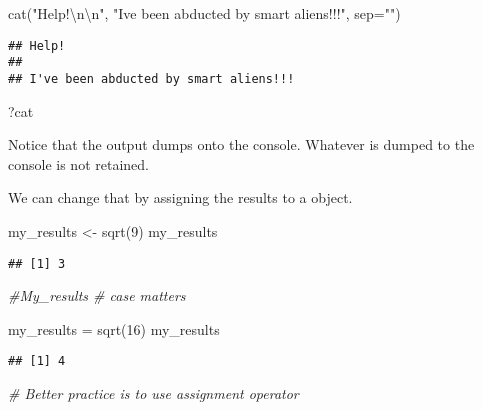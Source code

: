 \documentclass[
]{article}
\newenvironment{Shaded}{\begin{snugshade}}{\end{snugshade}}
\newcommand{\AttributeTok}[1]{\textcolor[rgb]{0.77,0.63,0.00}{#1}}
\newcommand{\CommentTok}[1]{\textcolor[rgb]{0.56,0.35,0.01}{\textit{#1}}}
\newcommand{\DecValTok}[1]{\textcolor[rgb]{0.00,0.00,0.81}{#1}}
\newcommand{\FunctionTok}[1]{\textcolor[rgb]{0.00,0.00,0.00}{#1}}
\newcommand{\NormalTok}[1]{#1}
\newcommand{\OtherTok}[1]{\textcolor[rgb]{0.56,0.35,0.01}{#1}}
\newcommand{\SpecialCharTok}[1]{\textcolor[rgb]{0.00,0.00,0.00}{#1}}
\newcommand{\StringTok}[1]{\textcolor[rgb]{0.31,0.60,0.02}{#1}}
\begin{document}
\begin{Shaded}
\begin{Highlighting}[]
\FunctionTok{cat}\NormalTok{(}\StringTok{"Help!}\SpecialCharTok{\textbackslash{}n\textbackslash{}n}\StringTok{"}\NormalTok{, }\StringTok{"I\textquotesingle{}ve been abducted by smart aliens!!!"}\NormalTok{, }\AttributeTok{sep=}\StringTok{""}\NormalTok{)}
\end{Highlighting}
\end{Shaded}

\begin{verbatim}
## Help!
## 
## I've been abducted by smart aliens!!!
\end{verbatim}

\begin{Shaded}
\begin{Highlighting}[]
\NormalTok{?cat}
\end{Highlighting}
\end{Shaded}

Notice that the output dumps onto the console. Whatever is dumped to the
console is not retained.

We can change that by assigning the results to a object.

\begin{Shaded}
\begin{Highlighting}[]
\NormalTok{my\_results }\OtherTok{\textless{}{-}} \FunctionTok{sqrt}\NormalTok{(}\DecValTok{9}\NormalTok{)}
\NormalTok{my\_results}
\end{Highlighting}
\end{Shaded}

\begin{verbatim}
## [1] 3
\end{verbatim}

\begin{Shaded}
\begin{Highlighting}[]
\CommentTok{\#My\_results   \# case matters}

\NormalTok{my\_results }\OtherTok{=} \FunctionTok{sqrt}\NormalTok{(}\DecValTok{16}\NormalTok{)}
\NormalTok{my\_results}
\end{Highlighting}
\end{Shaded}

\begin{verbatim}
## [1] 4
\end{verbatim}

\begin{Shaded}
\begin{Highlighting}[]
\CommentTok{\# Better practice is to use assignment operator}
\end{Highlighting}
\end{Shaded}
\end{document}
